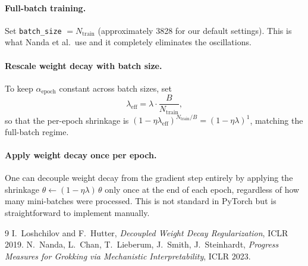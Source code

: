 \documentclass[11pt]{article}
\begin{document}
\paragraph{Full-batch training.}
Set \texttt{batch\_size} $= N_{\mathrm{train}}$ (approximately 3828 for our
default settings).  This is what Nanda et al.\ use and it completely
eliminates the oscillations.

\paragraph{Rescale weight decay with batch size.}
To keep $\alpha_{\mathrm{epoch}}$ constant across batch sizes, set
\begin{equation}
    \lambda_{\mathrm{eff}} = \lambda \cdot \frac{B}{N_{\mathrm{train}}},
\end{equation}
so that the per-epoch shrinkage is $(1-\eta\lambda_{\mathrm{eff}})^{N_{\mathrm{train}}/B}
= (1-\eta\lambda)^1$, matching the full-batch regime.

\paragraph{Apply weight decay once per epoch.}
One can decouple weight decay from the gradient step entirely by applying
the shrinkage $\theta \leftarrow (1-\eta\lambda)\,\theta$ only once at the
end of each epoch, regardless of how many mini-batches were processed.
This is not standard in PyTorch but is straightforward to implement manually.

\begin{thebibliography}{9}
I.~Loshchilov and F.~Hutter,
\textit{Decoupled Weight Decay Regularization},
ICLR 2019.
N.~Nanda, L.~Chan, T.~Lieberum, J.~Smith, J.~Steinhardt,
\textit{Progress Measures for Grokking via Mechanistic Interpretability},
ICLR 2023.
\end{thebibliography}
\end{document}
